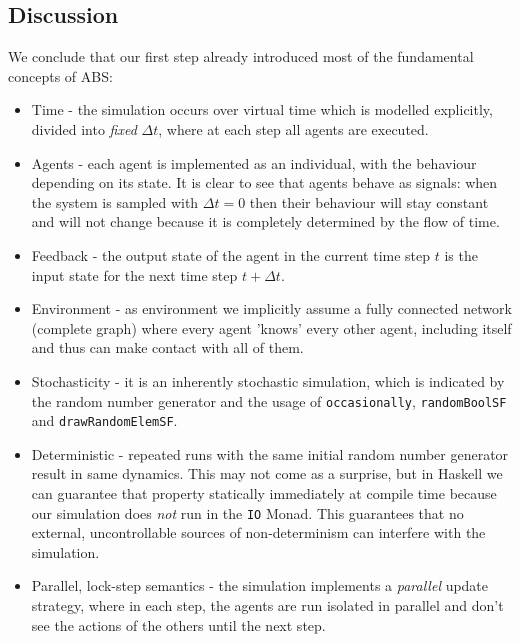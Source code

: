 \subsection{Discussion}
We conclude that our first step already introduced most of the fundamental concepts of ABS:
\begin{itemize}
	\item Time - the simulation occurs over virtual time which is modelled explicitly, divided into \textit{fixed} $\Delta t$, where at each step all agents are executed.
	
	\item Agents - each agent is implemented as an individual, with the behaviour depending on its state. It is clear to see that agents behave as signals: when the system is sampled with $\Delta t = 0$ then their behaviour will stay constant and will not change because it is completely determined by the flow of time. 
	
	\item Feedback - the output state of the agent in the current time step $t$ is the input state for the next time step $t + \Delta t$.
	
	\item Environment - as environment we implicitly assume a fully connected network (complete graph) where every agent 'knows' every other agent, including itself and thus can make contact with all of them.
	
	\item Stochasticity - it is an inherently stochastic simulation, which is indicated by the random number generator and the usage of \texttt{occasionally}, \texttt{randomBoolSF} and \texttt{drawRandomElemSF}.
	
	\item Deterministic - repeated runs with the same initial random number generator result in same dynamics. This may not come as a surprise, but in Haskell we can guarantee that property statically immediately at compile time because our simulation does \textit{not} run in the \texttt{IO} Monad. This guarantees that no external, uncontrollable sources of non-determinism can interfere with the simulation.
	
	\item Parallel, lock-step semantics - the simulation implements a \textit{parallel} update strategy, where in each step, the agents are run isolated in parallel and don't see the actions of the others until the next step.
\end{itemize}

